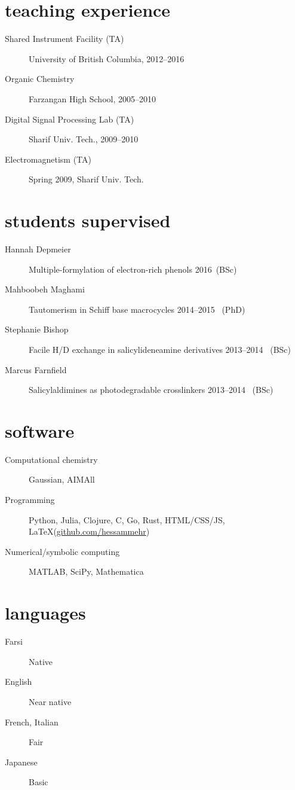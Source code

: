 \documentclass[overlapped,line,10pt,letterpaper]{res}
\begin{document}
\begin{resume}
\section{teaching experience}
\begin{description}
\item[Shared Instrument Facility (TA)] University of British Columbia, 2012–2016
\item[Organic Chemistry] Farzangan High School, 2005–2010
\item[Digital Signal Processing Lab (TA)] Sharif Univ. Tech., 2009–2010
\item[Electromagnetism (TA)] Spring 2009, Sharif Univ. Tech.
\end{description}

\section{students supervised}
\begin{description}
\item[Hannah Depmeier] Multiple-formylation of electron-rich phenols \hspace{\fill} 2016\, (BSc)
\item[Mahboobeh Maghami] Tautomerism in Schiff base macrocycles \hspace{\fill} 2014–2015 \, (PhD)
\item[Stephanie Bishop] Facile H/D exchange in salicylideneamine derivatives \hspace{\fill} 2013–2014 \, (BSc)
\item[Marcus Farnfield]  Salicylaldimines as photodegradable crosslinkers \hspace{\fill} 2013–2014 \, (BSc)
\end{description}

\section{software}
\begin{description}
\item[Computational chemistry] Gaussian, AIMAll
\item[Programming] Python, Julia, Clojure, C, Go, Rust, HTML/CSS/JS, \LaTeX (\href{https://github.com/hessammehr}{github.com/hessammehr})
\item[Numerical/symbolic computing] MATLAB, SciPy, Mathematica
\end{description}

\section{languages}
\begin{description}
\item[Farsi] Native
\item[English] Near native
\item[French, Italian] Fair
\item[Japanese] Basic
\end{description}
\end{resume}
\end{document}
